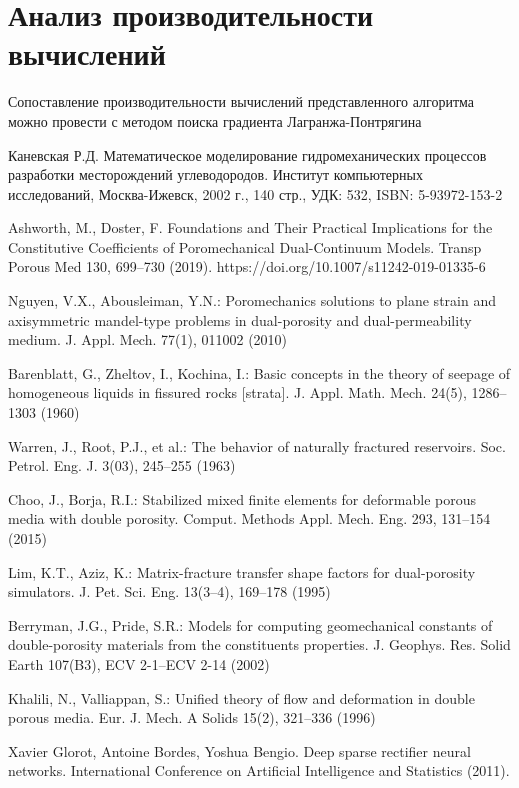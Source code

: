 \documentclass[14pt]{article}
\begin{document}
\section{Анализ производительности вычислений}
Сопоставление производительности вычислений представленного алгоритма можно провести с методом поиска градиента Лагранжа-Понтрягина
\newpage


\begin{thebibliography}{10}

	 Каневская Р.Д. Математическое моделирование гидромеханических процессов разработки месторождений углеводородов. Институт компьютерных исследований, Москва-Ижевск, 2002 г., 140 стр., УДК: 532, ISBN: 5-93972-153-2

	 Ashworth, M., Doster, F. Foundations and Their Practical Implications for the Constitutive Coefficients of Poromechanical Dual-Continuum Models. Transp Porous Med 130, 699–730 (2019). https://doi.org/10.1007/s11242-019-01335-6	
	
	 Nguyen, V.X., Abousleiman, Y.N.: Poromechanics solutions to plane strain and axisymmetric mandel-type problems in dual-porosity and dual-permeability medium. J. Appl. Mech. 77(1), 011002 (2010)

	 Barenblatt, G., Zheltov, I., Kochina, I.: Basic concepts in the theory of seepage of homogeneous liquids in
fissured rocks [strata]. J. Appl. Math. Mech. 24(5), 1286–1303 (1960)	
	
	 Warren, J., Root, P.J., et al.: The behavior of naturally fractured reservoirs. Soc. Petrol. Eng. J. 3(03), 245–255 (1963)
		
	 Choo, J., Borja, R.I.: Stabilized mixed finite elements for deformable porous media with double porosity.
Comput. Methods Appl. Mech. Eng. 293, 131–154 (2015)

	 Lim, K.T., Aziz, K.: Matrix-fracture transfer shape factors for dual-porosity simulators. J. Pet. Sci. Eng. 13(3–4), 169–178 (1995)
		
	 Berryman, J.G., Pride, S.R.: Models for computing geomechanical constants of double-porosity materials from the constituents properties. J. Geophys. Res. Solid Earth 107(B3), ECV 2-1–ECV 2-14 (2002)
	
	 Khalili, N., Valliappan, S.: Unified theory of flow and deformation in double porous media. Eur. J. Mech. A Solids 15(2), 321–336 (1996)
	
	  Xavier Glorot, Antoine Bordes, Yoshua Bengio. Deep sparse rectifier neural networks. International Conference on Artificial Intelligence and Statistics (2011).
	
\end{thebibliography}
\end{document}
